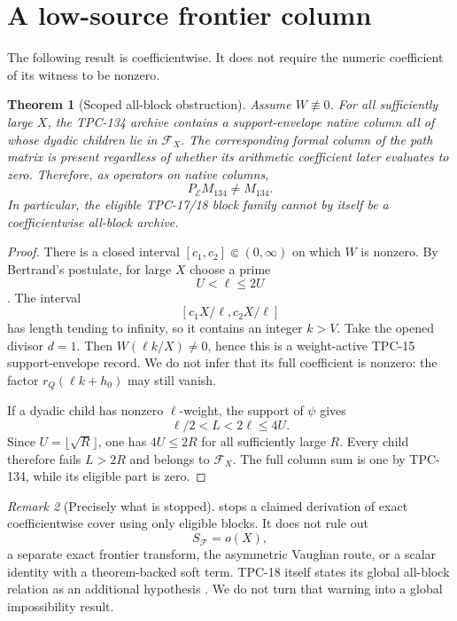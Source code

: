 \documentclass[11pt]{article}
\newtheorem{theorem}{Theorem}[section]
\theoremstyle{definition}
\theoremstyle{remark}
\newtheorem{remark}[theorem]{Remark}
\newcommand{\E}{\mathcal E}
\newcommand{\F}{\mathcal F}
\begin{document}
\section{A low-source frontier column}

The following result is coefficientwise.  It does not require the
numeric coefficient of its witness to be nonzero.

\begin{theorem}[Scoped all-block obstruction]
\label{thm:obstruction}
Assume \(W\not\equiv0\).  For all sufficiently large \(X\), the
TPC-134 archive contains a support-envelope native column all of whose
dyadic children lie in \(\F_X\).  The corresponding formal column of
the path matrix is present regardless of whether its arithmetic
coefficient later evaluates to zero.  Therefore, as operators on
native columns,
\[
 \boxed{P_{\E}M_{134}\ne M_{134}.}
\]
In particular, the eligible TPC-17/18 block family cannot by itself
be a coefficientwise all-block archive.
\end{theorem}

\begin{proof}
There is a closed interval
\([c_1,c_2]\Subset(0,\infty)\) on which \(W\) is nonzero.  By
Bertrand's postulate, for large \(X\) choose a prime
\[
 U<\ell\le2U
\]
\citep{Apostol1976}.  The interval
\[
 [c_1X/\ell,c_2X/\ell]
\]
has length tending to infinity, so it contains an integer \(k>V\).
Take the opened divisor \(d=1\).  Then \(W(\ell k/X)\ne0\), hence this
is a weight-active TPC-15 support-envelope record.  We do not infer
that its full coefficient is nonzero: the factor
\(r_Q(\ell k+h_0)\) may still vanish.

If a dyadic child has nonzero \(\ell\)-weight, the support of
\(\psi\) gives
\[
 \ell/2<L<2\ell\le4U.
\]
Since \(U=\lfloor\sqrt R\rfloor\), one has \(4U\le2R\) for all
sufficiently large \(R\).  Every child therefore fails \(L>2R\) and
belongs to \(\F_X\).  The full column sum is one by TPC-134, while its
eligible part is zero.
\end{proof}

\begin{remark}[Precisely what is stopped]
 stops a claimed derivation of exact
coefficientwise cover using only eligible blocks.  It does not rule
out
\[
 S_{\F}=o(X),
\]
a separate exact frontier transform, the asymmetric Vaughan route,
or a scalar identity with a theorem-backed soft term.  TPC-18 itself
states its global all-block relation as an additional hypothesis
\citep{WangTPC18}.  We do not turn that warning into a global
impossibility result.
\end{remark}
\end{document}

